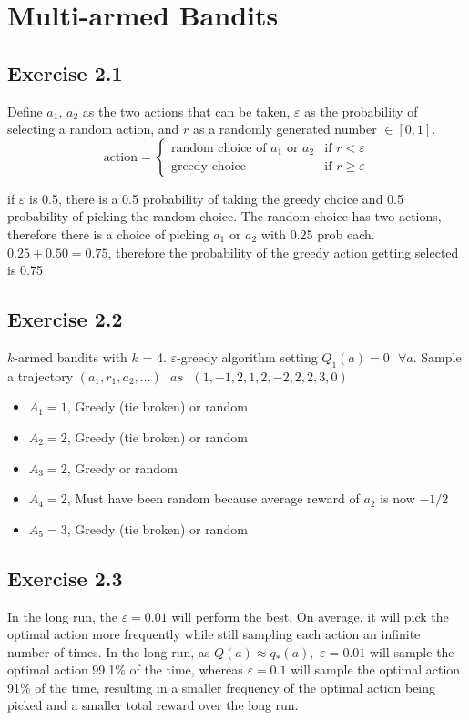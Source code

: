 \section{Multi-armed Bandits}

\subsection{Exercise 2.1}
Define $a_1$, $a_2$ as the two actions that can be taken, $\varepsilon$ as the probability of selecting a random action, and $r$ as a randomly generated number $\in [0,1]$. 
\begin{equation}
    \text{action} = 
    \begin{cases}
        \text{random choice of $a_1$ or $a_2$} & \text{if } r < \varepsilon \\
        \text{greedy choice} & \text{if } r \geq \varepsilon
        \end{cases}
\end{equation}

if $\varepsilon$ is 0.5, there is a 0.5 probability of taking the greedy choice and 0.5 probability of picking the random choice. The random choice has two actions, therefore there is a choice of picking $a_1$ or $a_2$ with 0.25 prob each. $0.25 + 0.50 = 0.75$, therefore the probability of the greedy action getting selected is 0.75

\subsection{Exercise 2.2}
$k$-armed bandits with $k$ = 4. $\varepsilon$-greedy algorithm setting $Q_1(a) = 0 \text{ }\forall a$.
Sample a trajectory $(a_1,r_1,a_2,\dots) \text{ } as \text{ } (1,-1, 2,1, 2,-2,2,2,3,0)$

\begin{itemize}
  \item $A_1 = 1$, Greedy (tie broken) or random
  \item $A_2 = 2$, Greedy (tie broken) or random
  \item $A_3 = 2$, Greedy or random
  \item $A_4 = 2$, Must have been random because average reward of $a_2$ is now $-1/2$
  \item $A_5 = 3$, Greedy (tie broken) or random
\end{itemize}

\subsection{Exercise 2.3}
In the long run, the $\varepsilon = 0.01$ will perform the best. On average, it will pick the optimal action more frequently while still sampling each action an infinite number of times. In the long run, as $Q(a) \approx q_*(a), $ $\varepsilon= 0.01$ will sample the optimal action 99.1\% of the time,  whereas $\varepsilon = 0.1$ will sample the optimal action 91\% of the time, resulting in a smaller frequency of the optimal action being picked and a smaller total reward over the long run. 